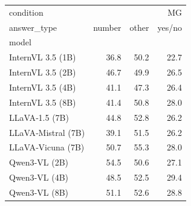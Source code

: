 \begin{tabular}{lrrr}
\toprule
condition & \multicolumn{3}{r}{MG} \\
answer_type & number & other & yes/no \\
model &  &  &  \\
\midrule
InternVL 3.5 (1B) & 36.8 & 50.2 & 22.7 \\
InternVL 3.5 (2B) & 46.7 & 49.9 & 26.5 \\
InternVL 3.5 (4B) & 41.1 & 47.3 & 26.4 \\
InternVL 3.5 (8B) & 41.4 & 50.8 & 28.0 \\
LLaVA‑1.5 (7B) & 44.8 & 52.8 & 26.2 \\
LLaVA‑Mistral (7B) & 39.1 & 51.5 & 26.2 \\
LLaVA‑Vicuna (7B) & 50.7 & 55.3 & 28.0 \\
Qwen3‑VL (2B) & 54.5 & 50.6 & 27.1 \\
Qwen3‑VL (4B) & 48.5 & 52.5 & 29.4 \\
Qwen3‑VL (8B) & 51.1 & 52.6 & 28.8 \\
\bottomrule
\end{tabular}
